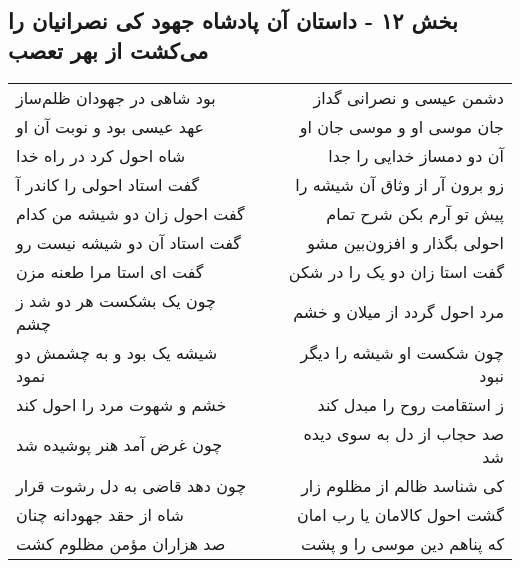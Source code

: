 \begin{center}
\section*{بخش ۱۲ - داستان آن پادشاه جهود کی نصرانیان را می‌کشت از بهر تعصب}
\label{sec:sh012}
\begin{longtable}{l p{0.5cm} r}
بود شاهی در جهودان ظلم‌ساز
&&
دشمن عیسی و نصرانی گداز
\\
عهد عیسی بود و نوبت آن او
&&
جان موسی او و موسی جان او
\\
شاه احول کرد در راه خدا
&&
آن دو دمساز خدایی را جدا
\\
گفت استاد احولی را کاندر آ
&&
زو برون آر از وثاق آن شیشه را
\\
گفت احول زان دو شیشه من کدام
&&
پیش تو آرم بکن شرح تمام
\\
گفت استاد آن دو شیشه نیست رو
&&
احولی بگذار و افزون‌بین مشو
\\
گفت ای استا مرا طعنه مزن
&&
گفت استا زان دو یک را در شکن
\\
چون یک بشکست هر دو شد ز چشم
&&
مرد احول گردد از میلان و خشم
\\
شیشه یک بود و به چشمش دو نمود
&&
چون شکست او شیشه را دیگر نبود
\\
خشم و شهوت مرد را احول کند
&&
ز استقامت روح را مبدل کند
\\
چون غرض آمد هنر پوشیده شد
&&
صد حجاب از دل به سوی دیده شد
\\
چون دهد قاضی به دل رشوت قرار
&&
کی شناسد ظالم از مظلوم زار
\\
شاه از حقد جهودانه چنان
&&
گشت احول کالامان یا رب امان
\\
صد هزاران مؤمن مظلوم کشت
&&
که پناهم دین موسی را و پشت
\\
\end{longtable}
\end{center}
